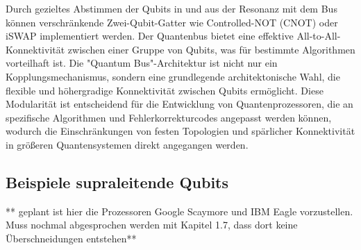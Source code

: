 Durch gezieltes Abstimmen der Qubits in und aus der Resonanz mit dem Bus können verschränkende Zwei-Qubit-Gatter wie Controlled-NOT (CNOT) oder iSWAP implementiert werden. Der Quantenbus bietet eine effektive All-to-All-Konnektivität zwischen einer Gruppe von Qubits, was für bestimmte Algorithmen vorteilhaft ist. Die "Quantum Bus"-Architektur ist nicht nur ein Kopplungsmechanismus, sondern eine grundlegende architektonische Wahl, die flexible und höhergradige Konnektivität zwischen Qubits ermöglicht. Diese Modularität ist entscheidend für die Entwicklung von Quantenprozessoren, die an spezifische Algorithmen und Fehlerkorrekturcodes angepasst werden können, wodurch die Einschränkungen von festen Topologien und spärlicher Konnektivität in größeren Quantensystemen direkt angegangen werden.

\subsection{Beispiele supraleitende Qubits}
** geplant ist hier die Prozessoren Google Scaymore und IBM Eagle vorzustellen. Muss nochmal abgesprochen werden mit Kapitel 1.7, dass dort keine Überschneidungen entstehen**
